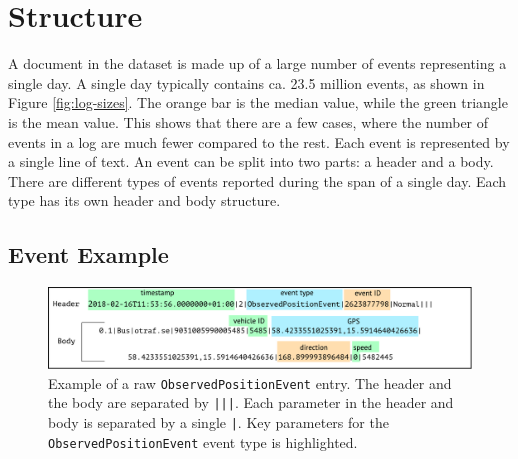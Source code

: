 \section{Structure} \label{sec:data-structure}
A document in the dataset is made up of a large number of events representing a single day.
A single day typically contains ca. 23.5 million events, as shown in Figure \ref{fig:log-sizes}.
The orange bar is the median value, while the green triangle is the mean value.
This shows that there are a few cases, where the number of events in a log are much fewer compared to the rest.
Each event is represented by a single line of text.
An event can be split into two parts: a header and a body.
There are different types of events reported during the span of a single day.
Each type has its own header and body structure.

\subsection{Event Example}

\begin{figure}[t!]
    \centering
    \includegraphics[width=\textwidth]{figures/data-example-1}
    \caption[Example of a raw \texttt{ObservedPositionEvent} entry]
    {\small Example of a raw \texttt{ObservedPositionEvent} entry.
    The header and the body are separated by \texttt{|||}.
    Each parameter in the header and body is separated by a single \texttt{|}.
    Key parameters for the \texttt{ObservedPositionEvent} event type is highlighted.}
    \label{fig:data-ex-1}
\end{figure}

